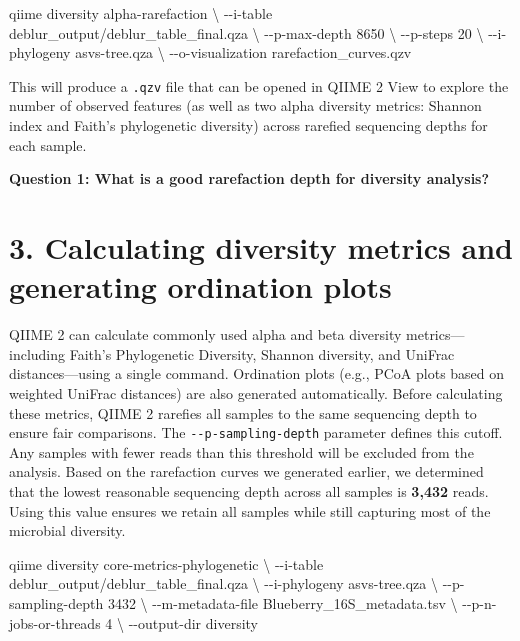 \documentclass[
]{book}
\newenvironment{Shaded}{\begin{snugshade}}{\end{snugshade}}
\newcommand{\AttributeTok}[1]{\textcolor[rgb]{0.13,0.29,0.53}{#1}}
\newcommand{\DataTypeTok}[1]{\textcolor[rgb]{0.13,0.29,0.53}{#1}}
\newcommand{\ExtensionTok}[1]{#1}
\newcommand{\NormalTok}[1]{#1}
\begin{document}
\begin{Shaded}
\begin{Highlighting}[]
\ExtensionTok{qiime}\NormalTok{ diversity alpha{-}rarefaction }\DataTypeTok{\textbackslash{}}
  \AttributeTok{{-}{-}i{-}table}\NormalTok{ deblur\_output/deblur\_table\_final.qza }\DataTypeTok{\textbackslash{}}
  \AttributeTok{{-}{-}p{-}max{-}depth}\NormalTok{ 8650 }\DataTypeTok{\textbackslash{}}
  \AttributeTok{{-}{-}p{-}steps}\NormalTok{ 20 }\DataTypeTok{\textbackslash{}}
  \AttributeTok{{-}{-}i{-}phylogeny}\NormalTok{ asvs{-}tree.qza }\DataTypeTok{\textbackslash{}}
  \AttributeTok{{-}{-}o{-}visualization}\NormalTok{ rarefaction\_curves.qzv}
\end{Highlighting}
\end{Shaded}

This will produce a \texttt{.qzv} file that can be opened in QIIME 2 View to explore the number of observed features (as well as two alpha diversity metrics: Shannon index and Faith's phylogenetic diversity) across rarefied sequencing depths for each sample.

\textbf{Question 1: What is a good rarefaction depth for diversity analysis?}

\section{3. Calculating diversity metrics and generating ordination plots}\label{diversity-ordination}

QIIME 2 can calculate commonly used alpha and beta diversity metrics---including Faith's Phylogenetic Diversity, Shannon diversity, and UniFrac distances---using a single command. Ordination plots (e.g., PCoA plots based on weighted UniFrac distances) are also generated automatically. Before calculating these metrics, QIIME 2 rarefies all samples to the same sequencing depth to ensure fair comparisons. The \texttt{-\/-p-sampling-depth} parameter defines this cutoff. Any samples with fewer reads than this threshold will be excluded from the analysis. Based on the rarefaction curves we generated earlier, we determined that the lowest reasonable sequencing depth across all samples is \textbf{3,432} reads. Using this value ensures we retain all samples while still capturing most of the microbial diversity.

\begin{Shaded}
\begin{Highlighting}[]
\ExtensionTok{qiime}\NormalTok{ diversity core{-}metrics{-}phylogenetic }\DataTypeTok{\textbackslash{}}
  \AttributeTok{{-}{-}i{-}table}\NormalTok{ deblur\_output/deblur\_table\_final.qza }\DataTypeTok{\textbackslash{}}
  \AttributeTok{{-}{-}i{-}phylogeny}\NormalTok{ asvs{-}tree.qza }\DataTypeTok{\textbackslash{}}
  \AttributeTok{{-}{-}p{-}sampling{-}depth}\NormalTok{ 3432  }\DataTypeTok{\textbackslash{}}
  \AttributeTok{{-}{-}m{-}metadata{-}file}\NormalTok{ Blueberry\_16S\_metadata.tsv }\DataTypeTok{\textbackslash{}}
  \AttributeTok{{-}{-}p{-}n{-}jobs{-}or{-}threads}\NormalTok{ 4 }\DataTypeTok{\textbackslash{}}
  \AttributeTok{{-}{-}output{-}dir}\NormalTok{ diversity}
\end{Highlighting}
\end{Shaded}
\end{document}
